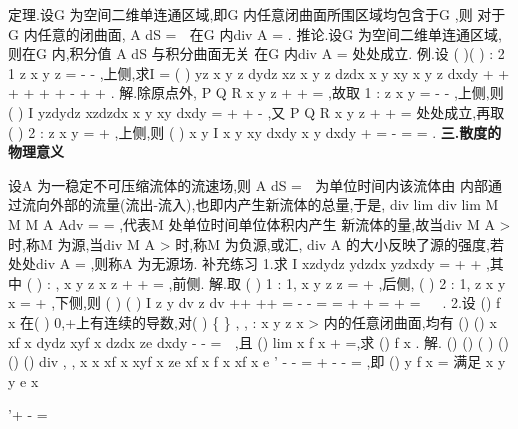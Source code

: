 \textcolor{lyred}{定理}.设G 为空间二维单连通区域,即G 内任意闭曲面所围区域均包含于G ,则 
对于G 内任意的闭曲面\Sigma ,
A dS
\Sigma 
\cdots 
=
\Leftrightarrow 
\int \int 
\rho 
\rho 

在G 内div
A =
\rho 
. 
\textcolor{lyred}{推论}.设G 为空间二维单连通区域,则在G 内,积分值
A dS
\Sigma 
\cdots 
\int \int 
\rho 
\rho 
与积分曲面无关 
\Leftrightarrow 在G 内div
A =
\rho 
处处成立. 
\textcolor{lyred}{例}.设
(
)(
)
:
2 1
z
x
y
z
\Sigma 
=
-
-
\ge 
,上侧,求I = 
(
)
yz x
y
z dydz
xz x
y
z dzdx
x y
xy x
y
z
dxdy
\Sigma 
+
+
+
+
+
+
-
+
+
\int \int 
. 
解.除原点外,
P
Q
R
x
y
z
\partial 
\partial 
\partial 
+
+
=
\partial 
\partial 
\partial 
,故取
1 :
z
x
y
\Sigma 
=
-
-
,上侧,则 
(
)
I
yzdydz
xzdzdx
x y
xy dxdy
\Sigma 
=
+
+
-
\int \int 
,又
P
Q
R
x
y
z
\partial 
\partial 
\partial 
+
+
=
\partial 
\partial 
\partial 
处处成立,再取 
(
)
2 :
z
x
y
\Sigma 
=
+
\le 
,上侧,则
(
)
x
y
I
x y
xy dxdy
x y dxdy
\pi 
\Sigma 
+
\le 
=
-
=
=
\int \int 
\int \int 
. 
\vspace{4pt}
{\bfseries \textcolor{lyred}{三.散度的物理意义}}

设A
\rho 
为一稳定不可压缩流体的流速场,则
A dS
\partial \Omega 
\Phi =
\cdots 
\int \int 
\rho 
\rho 

为单位时间内该流体由\Omega  
内部通过\partial \Omega 流向外部的流量(流出-流入),也即\Omega 内产生新流体的总量,于是, 
div
lim
div
lim
M
M
M
A
Adv
\Delta \Omega \to 
\Delta \Omega \to 
\Delta \Omega 
=
=
\Phi 
\Delta \Omega 
\Delta \Omega 
\int \int \int 
\rho 
\rho 
,代表M 处单位时间单位体积内产生 
新流体的量,故当div
M
A
>
\rho 
时,称M 为\textcolor{lyred}{源},当div
M
A
>
\rho 
时,称M 为\textcolor{lyred}{负源},或\textcolor{lyred}{汇}, 
div A
\rho 
的大小反映了源的强度,若处处div
A =
\rho 
,则称A
\rho 
为\textcolor{lyred}{无源场}. 
\textcolor{lyred}{补充练习 }
1.求
I
xzdydz
ydzdx
yzdxdy
\Sigma 
=
+
+
\int \int 
,其中
(
)
:
,
x
y
z
x z
\Sigma 
+
+
=
\ge 
,前侧. 
解.取
(
)
1 :
1,
x
y
z
z
\Sigma 
=
+
\le 
\ge 
,后侧,
(
)
2 :
1,
z
x
y
x
\Sigma 
=
+
\le 
\ge 
,下侧,则 
(
)
(
)
I
z
y dv
z
dv
\pi 
\Sigma +\Sigma +\Sigma 
\Sigma 
\Sigma 
\Sigma +\Sigma +\Sigma 
\Omega 
\Omega 
=
-
-
=
=
+
+
=
+
=
\int \int 
\int \int 
\int \int 
\int \int 
\int \int \int 
\int \int \int 


. 
2.设
()
f x 在(
)
0,+\infty 上有连续的导数,对(
)
\{
\}
, ,
:
x y z
x >
内的任意闭曲面\Sigma ,均有 
()
()
x
xf x dydz
xyf x dzdx
ze dxdy
\Sigma 
-
-
=
\int \int 
,且
()
lim
x
f x
+
\to 
=,求
()
f x . 
解.
()
()
(
)
()
()
()
div
,
,
x
x
xf x
xyf x
ze
xf
x
f x
xf x
e
'
-
-
=
+
-
-
=
,即
()
y
f x
=
满足 
x
y
y
e
x


'+
-
=




